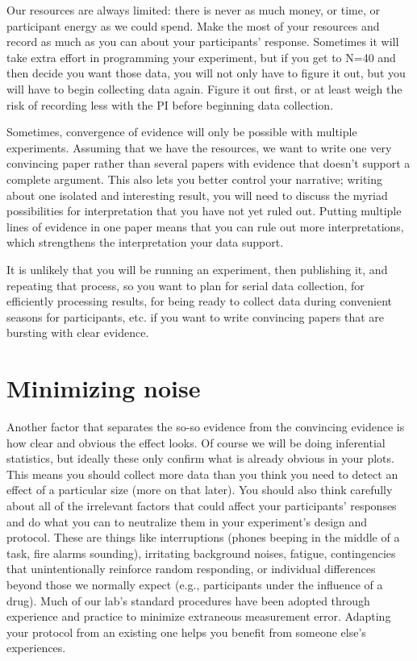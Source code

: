 \documentclass[
  12pt,
]{book}
\begin{document}
Our resources are always limited: there is never as much money, or time, or participant energy as we could spend. Make the most of your resources and record as much as you can about your participants' response. Sometimes it will take extra effort in programming your experiment, but if you get to N=40 and then decide you want those data, you will not only have to figure it out, but you will have to begin collecting data again. Figure it out first, or at least weigh the risk of recording less with the PI before beginning data collection.

Sometimes, convergence of evidence will only be possible with multiple experiments. Assuming that we have the resources, we want to write one very convincing paper rather than several papers with evidence that doesn't support a complete argument. This also lets you better control your narrative; writing about one isolated and interesting result, you will need to discuss the myriad possibilities for interpretation that you have not yet ruled out. Putting multiple lines of evidence in one paper means that you can rule out more interpretations, which strengthens the interpretation your data support.

It is unlikely that you will be running an experiment, then publishing it, and repeating that process, so you want to plan for serial data collection, for efficiently processing results, for being ready to collect data during convenient seasons for participants, etc. if you want to write convincing papers that are bursting with clear evidence.

\section{Minimizing noise}\label{minimizing-noise}

Another factor that separates the so-so evidence from the convincing evidence is how clear and obvious the effect looks. Of course we will be doing inferential statistics, but ideally these only confirm what is already obvious in your plots. This means you should collect more data than you think you need to detect an effect of a particular size (more on that later). You should also think carefully about all of the irrelevant factors that could affect your participants' responses and do what you can to neutralize them in your experiment's design and protocol. These are things like interruptions (phones beeping in the middle of a task, fire alarms sounding), irritating background noises, fatigue, contingencies that unintentionally reinforce random responding, or individual differences beyond those we normally expect (e.g., participants under the influence of a drug). Much of our lab's standard procedures have been adopted through experience and practice to minimize extraneous measurement error. Adapting your protocol from an existing one helps you benefit from someone else's experiences.
\end{document}
